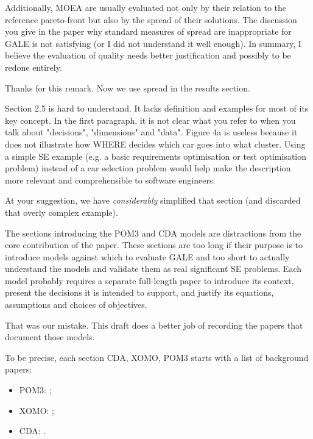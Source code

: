 \documentclass[10pt,journal,compsoc]{IEEEtran}
\newcommand{\bi}{\begin{itemize}}
\newcommand{\ei}{\end{itemize}}
\newenvironment{changed}{\par}{\par}
\begin{document}
Additionally, MOEA are usually evaluated not only
by their relation to the reference pareto-front but
also by the spread of their solutions. The
discussion you give in the paper why standard
measures of spread are inappropriate for GALE is not
satisfying (or I did not understand it well enough).
In summary, I believe the evaluation of quality
needs better justification and possibly to be redone
entirely.

\begin{changed}
Thanks for this remark. Now we use spread in the results section.
\end{changed}



Section 2.5 is hard to understand. It lacks
definition and examples for most of its key
concept. In the first paragraph, it is not clear
what you refer to when you talk about "decisions",
"dimensions" and "data". Figure 4a is useless
because it does not illustrate how WHERE decides
which car goes into what cluster. Using a simple SE
example (e.g. a basic requirements optimisation or
test optimisation problem) instead of a car
selection problem would help make the description
more relevant and comprehensible to software
engineers.


\begin{changed}
At your suggestion, we have {\em considerably} simplified that section (and discarded that
overly complex example).
\end{changed}

The sections introducing the POM3 and CDA models are
distractions from the core contribution of the
paper. These sections are too long if their purpose
is to introduce models against which to evaluate
GALE and too short to actually understand the models
and validate them as real significant SE
problems. Each model probably requires a separate
full-length paper to introduce its context, present
the decisions it is intended to support, and justify
its equations, assumptions and choices of
objectives.

\begin{changed}
That was our mistake. This draft does a better job of 
recording the papers that document those models. 

To be precise, each section CDA, XOMO, POM3 starts with a list
of background papers:

\bi
\item POM3: \cite{port08,me09j,1204376,turner03};
\item XOMO: \cite{me07f,me09a,me09e};
\item CDA:  \cite{Kim2011,Pritchett2011,Feigh2012,Kim2013,Pritchett2013}.
\ei
\end{changed}
\end{document}
